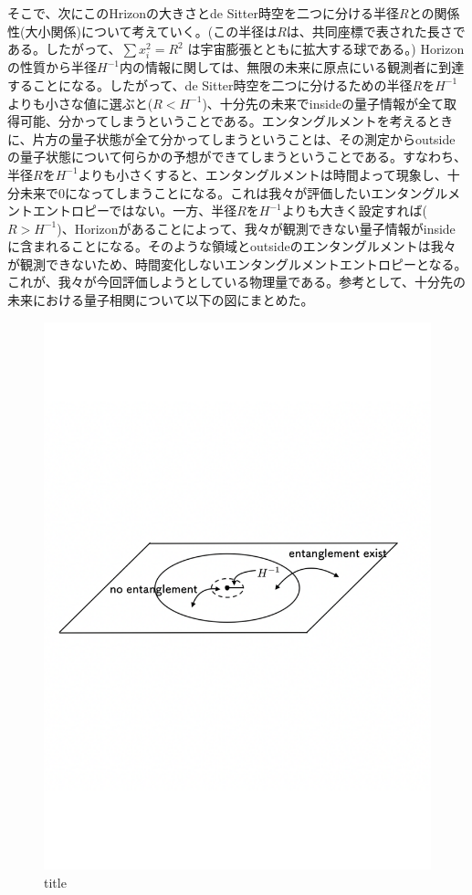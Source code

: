 そこで、次にこのHrizonの大きさとde Sitter時空を二つに分ける半径$R$との関係性(大小関係)について考えていく。(この半径は$R$は、共同座標で表された長さである。したがって、$\sum x_i^2 = R^2$ は宇宙膨張とともに拡大する球である。) Horizonの性質から半径$H^{-1}$内の情報に関しては、無限の未来に原点にいる観測者に到達することになる。したがって、de Sitter時空を二つに分けるための半径$R$を$H^{-1}$よりも小さな値に選ぶと($R<H^{-1}$)、十分先の未来でinsideの量子情報が全て取得可能、分かってしまうということである。エンタングルメントを考えるときに、片方の量子状態が全て分かってしまうということは、その測定からoutsideの量子状態について何らかの予想ができてしまうということである。すなわち、半径$R$を$H^{-1}$よりも小さくすると、エンタングルメントは時間よって現象し、十分未来で0になってしまうことになる。これは我々が評価したいエンタングルメントエントロピーではない。一方、半径$R$を$H^{-1}$よりも大きく設定すれば($R>H^{-1}$)、Horizonがあることによって、我々が観測できない量子情報がinsideに含まれることになる。そのような領域とoutsideのエンタングルメントは我々が観測できないため、時間変化しないエンタングルメントエントロピーとなる。これが、我々が今回評価しようとしている物理量である。参考として、十分先の未来における量子相関について以下の図にまとめた。

\begin{figure}[H]
  \begin{center}
  \includegraphics[width=13cm,angle=0]{entangless.pdf}
  \caption{title}
  \end{center}
\end{figure}





